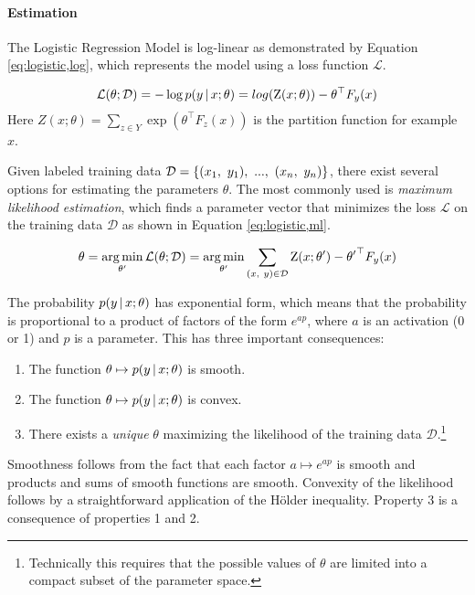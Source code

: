 \paragraph{Estimation}
The Logistic Regression Model is log-linear as demonstrated by
Equation \ref{eq:logistic,log}, which represents the model using a
loss function $\mathcal{L}$.

\begin{equation}
\mathcal{L}(\theta\mbox{$ ; \, $}\mathcal{D}) = -\log p(y\mbox{$ \, | \, $} x\mbox{$ ; \, $} \theta) = log(\mbox{${\rm Z}$}(x;\theta)) - \theta^\top F_y(x)\label{eq:logistic,log}
\end{equation}
Here $Z(x;\theta) = \sum_{z \in Y}\exp(\theta^\top F_{z}(x))$ is the partition function for example $x$.

Given labeled training data $\mbox{${\mathcal{D}}$} = \{(x_1,\ y_1),\ ...,\ (x_n,\
y_n)\}$, there exist several options for estimating the parameters
$\theta$. The most commonly used is {\it maximum likelihood estimation},
which finds a parameter vector that minimizes the loss $\mathcal{L}$ on the
training data $\mathcal{D}$ as shown in Equation \eqref{eq:logistic,ml}.

\begin{equation}
\theta = \operatorname*{arg\,min}_{\theta'} \mathcal{L}(\theta\mbox{$ ; \, $} \mathcal{D}) = \operatorname*{arg\,min}_{\theta'}\sum_{(x,\ y) \in \mathcal{D}} \mbox{${\rm Z}$}(x\mbox{$ ; \, $} \theta') - {\theta'}^\top F_y(x)\label{eq:logistic,ml}
\end{equation}

The probability $p(y\mbox{$ \, | \, $} x\mbox{$ ; \, $} \theta)$ has exponential form,
which means that the probability is proportional to a product of
factors of the form $e^{ap}$, where $a$ is an activation (0 or 1) and
$p$ is a parameter. This has three important consequences:

\begin{enumerate}
\item The function $\theta \mapsto p(y\mbox{$ \, | \, $} x\mbox{$ ; \, $} \theta)$ is smooth.
\item The function $\theta \mapsto p(y\mbox{$ \, | \, $} x\mbox{$ ; \, $} \theta)$ is convex.
\item There exists a {\it unique} $\theta$ maximizing the likelihood of the training data $\mathcal{D}$.\footnote{Technically this requires that the possible values of $\theta$ are limited into a compact subset of the parameter space.}
\end{enumerate}

Smoothness follows from the fact that each factor $a \mapsto e^{ap}$
is smooth and products and sums of smooth functions are
smooth. Convexity of the likelihood follows by a straightforward application of the Hölder inequality. Property 3 is a consequence of properties 1 and 2.


